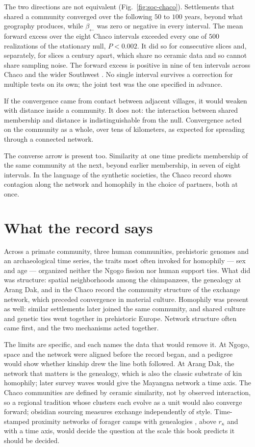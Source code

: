 The two directions are not equivalent (Fig.~\ref{fig:soc-chaco}). Settlements that shared
a community converged over the following $50$ to $100$ years, beyond what geography
produces, while $\beta_{\leftarrow}$ was zero or negative in every interval. The mean
forward excess over the eight Chaco intervals exceeded every one of $500$ realizations of
the stationary null, $P<0.002$. It did so for consecutive slices and, separately, for
slices a century apart, which share no ceramic data and so cannot share sampling noise.
The forward excess is positive in nine of ten intervals across Chaco and the wider
Southwest \citep{mills2013}. No single interval survives a correction for multiple tests
on its own; the joint test was the one specified in advance.

If the convergence came from contact between adjacent villages, it would weaken with
distance inside a community. It does not: the interaction between shared membership and
distance is indistinguishable from the null. Convergence acted on the community as a
whole, over tens of kilometers, as expected for spreading through a connected network.

The converse arrow is present too. Similarity at one time predicts membership of the same
community at the next, beyond earlier membership, in seven of eight intervals. In the
language of the synthetic societies, the Chaco record shows contagion along the network
and homophily in the choice of partners, both at once.

\section{What the record says}

Across a primate community, three human communities, prehistoric genomes and an
archaeological time series, the traits most often invoked for homophily --- sex and age
--- organized neither the Ngogo fission nor human support ties. What did was structure:
spatial neighborhoods among the chimpanzees, the genealogy at Arang Dak, and in the Chaco
record the community structure of the exchange network, which preceded convergence in
material culture. Homophily was present as well: similar settlements later joined the
same community, and shared culture and genetic ties went together in prehistoric Europe.
Network structure often came first, and the two mechanisms acted together.

The limits are specific, and each names the data that would remove it. At Ngogo, space
and the network were aligned before the record began, and a pedigree would show whether
kinship drew the line both followed. At Arang Dak, the network that matters is the
genealogy, which is also the classic substrate of kin homophily; later survey waves would
give the Mayangna network a time axis. The Chaco communities are defined by ceramic
similarity, not by observed interaction, so a regional tradition whose clusters each
evolve as a unit would also converge forward; obsidian sourcing measures exchange
independently of style. Time-stamped proximity networks of forager camps with genealogies
\citep{migliano2017,dyble2015}, above $r_\kappa$ and with a time axis, would decide the
question at the scale this book predicts it should be decided.


